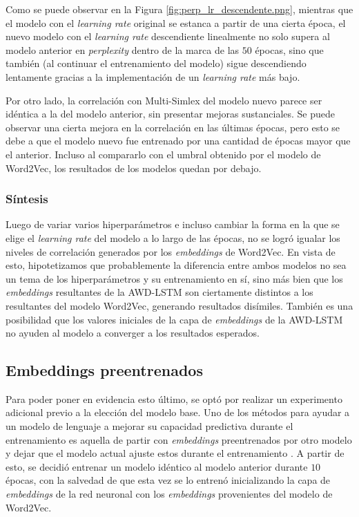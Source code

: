 Como se puede observar en la Figura \ref{fig:perp_lr_descendente.png}, mientras que el modelo con el \textit{learning rate} 
original se estanca a partir de una cierta época, el nuevo modelo con el \textit{learning rate} descendiente 
linealmente no solo supera al modelo anterior en \textit{perplexity} dentro de la marca de las $50$ 
épocas, sino que también (al continuar el entrenamiento del modelo) sigue descendiendo 
lentamente gracias a la implementación de un \textit{learning rate} más bajo.

Por otro lado, la correlación con Multi-Simlex del modelo nuevo parece ser idéntica a 
la del modelo anterior, sin presentar mejoras sustanciales. Se puede observar una cierta 
mejora en la correlación en las últimas épocas, pero esto se debe a que el modelo 
nuevo fue entrenado por una cantidad de épocas mayor que el anterior. Incluso 
al compararlo con el umbral obtenido por el modelo de Word2Vec, los resultados 
de los modelos quedan por debajo.

\subsubsection{Síntesis}

Luego de variar varios hiperparámetros e incluso cambiar la forma en la que se elige 
el \textit{learning rate} del modelo a lo largo de las épocas, no se logró igualar los 
niveles de correlación generados por los \textit{embeddings} de Word2Vec. En vista de esto, 
hipotetizamos que probablemente la diferencia entre ambos modelos no sea un 
tema de los hiperparámetros y su entrenamiento en sí, sino más bien que los 
\textit{embeddings} resultantes de la AWD-LSTM son ciertamente distintos a los 
resultantes del modelo Word2Vec, generando resultados disímiles. También 
es una posibilidad que los valores iniciales de la capa de \textit{embeddings} 
de la AWD-LSTM no ayuden al modelo a converger a los resultados esperados.

\subsection{Embeddings preentrenados}

Para poder poner en evidencia esto último, se optó por realizar un experimento 
adicional previo a la elección del modelo base. Uno de los métodos para ayudar 
a un modelo de lenguaje a mejorar su capacidad predictiva durante el entrenamiento 
es aquella de partir con \textit{embeddings} preentrenados por otro modelo y dejar que 
el modelo actual ajuste estos durante el entrenamiento \parencite{Wang2020}. A partir de esto, se decidió entrenar un modelo idéntico al modelo anterior 
durante $10$ épocas, con la salvedad de que esta vez se lo entrenó inicializando 
la capa de \textit{embeddings} de la red neuronal con los \textit{embeddings} provenientes 
del modelo de Word2Vec.

